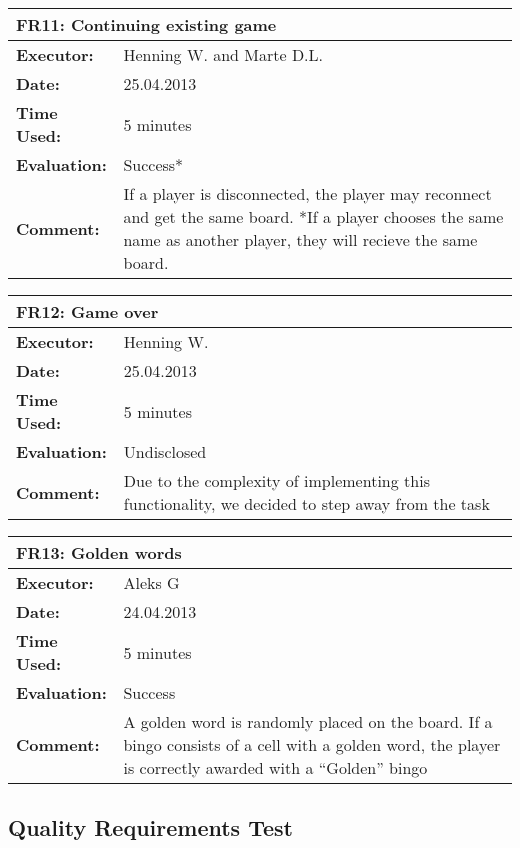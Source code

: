 \begin{tabular}{|m{}||m{}|}
\hline
\multicolumn{2}{|l|}{FR11: Continuing existing game} \\ \hline
\textbf{Executor:} & Henning W. and Marte D.L.\\ \hline
\textbf{Date:} & 25.04.2013\\ \hline
\textbf{Time Used:} & 5 minutes\\ \hline
\textbf{Evaluation:} & Success*\\ \hline
\textbf{Comment:} & If a player is disconnected, the player may reconnect and get the same board. 
*If a player chooses the same name as another player, they will recieve the same board.\\ \hline
\end{tabular}

\begin{tabular}{|m{}||m{}|}
\hline
\multicolumn{2}{|l|}{FR12: Game over} \\ \hline
\textbf{Executor:} & Henning W.\\ \hline
\textbf{Date:} & 25.04.2013\\ \hline
\textbf{Time Used:} & 5 minutes\\ \hline
\textbf{Evaluation:} & Undisclosed\\ \hline
\textbf{Comment:} & Due to the complexity of implementing this functionality, we decided to step away from the task\\ \hline
\end{tabular}


\begin{tabular}{|m{}||m{}|}
\hline
\multicolumn{2}{|l|}{FR13: Golden words} \\ \hline
\textbf{Executor:} & Aleks G\\ \hline
\textbf{Date:} & 24.04.2013\\ \hline
\textbf{Time Used:} & 5 minutes\\ \hline
\textbf{Evaluation:} & Success\\ \hline
\textbf{Comment:} & A golden word is randomly placed on the board. If a bingo consists of a cell with a golden word, the player is correctly awarded with a ``Golden'' bingo\\ \hline
\end{tabular}



\subsection{Quality Requirements Test}

